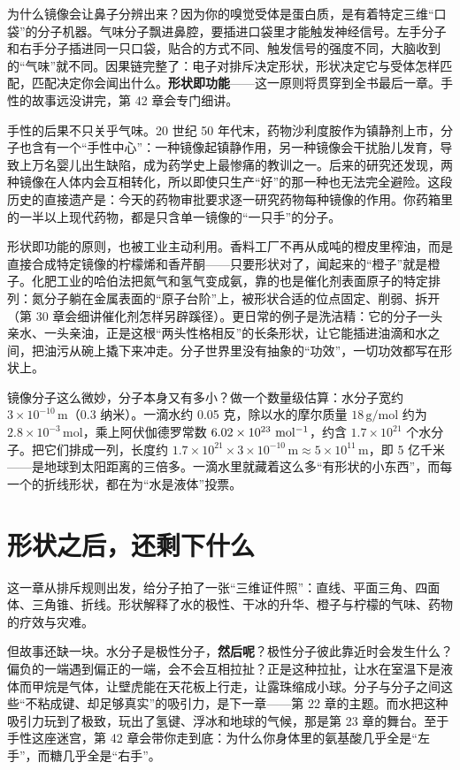 为什么镜像会让鼻子分辨出来？因为你的嗅觉受体是蛋白质，是有着特定三维“口袋”的分子机器。气味分子飘进鼻腔，要插进口袋里才能触发神经信号。左手分子和右手分子插进同一只口袋，贴合的方式不同、触发信号的强度不同，大脑收到的“气味”就不同。因果链完整了：电子对排斥决定形状，形状决定它与受体怎样匹配，匹配决定你会闻出什么。\textbf{形状即功能}——这一原则将贯穿到全书最后一章。手性的故事远没讲完，第 42 章会专门细讲。

手性的后果不只关乎气味。20 世纪 50 年代末，药物沙利度胺作为镇静剂上市，分子也含有一个“手性中心”：一种镜像起镇静作用，另一种镜像会干扰胎儿发育，导致上万名婴儿出生缺陷，成为药学史上最惨痛的教训之一。后来的研究还发现，两种镜像在人体内会互相转化，所以即使只生产“好”的那一种也无法完全避险。这段历史的直接遗产是：今天的药物审批要求逐一研究药物每种镜像的作用。你药箱里的一半以上现代药物，都是只含单一镜像的“一只手”的分子。

形状即功能的原则，也被工业主动利用。香料工厂不再从成吨的橙皮里榨油，而是直接合成特定镜像的柠檬烯和香芹酮——只要形状对了，闻起来的“橙子”就是橙子。化肥工业的哈伯法把氮气和氢气变成氨，靠的也是催化剂表面原子的特定排列：氮分子躺在金属表面的“原子台阶”上，被形状合适的位点固定、削弱、拆开（第 30 章会细讲催化剂怎样另辟蹊径）。更日常的例子是洗洁精：它的分子一头亲水、一头亲油，正是这根“两头性格相反”的长条形状，让它能插进油滴和水之间，把油污从碗上撬下来冲走。分子世界里没有抽象的“功效”，一切功效都写在形状上。

镜像分子这么微妙，分子本身又有多小？做一个数量级估算：水分子宽约 $3\times 10^{-10}\,\mathrm{m}$（0.3 纳米）。一滴水约 0.05 克，除以水的摩尔质量 $18\,\mathrm{g/mol}$ 约为 $2.8\times 10^{-3}\,\mathrm{mol}$，乘上阿伏伽德罗常数 $6.02\times 10^{23}\ \mathrm{mol^{-1}}$，约含 $1.7\times 10^{21}$ 个水分子。把它们排成一列，长度约 $1.7\times 10^{21} \times 3\times 10^{-10}\,\mathrm{m} \approx 5\times 10^{11}\,\mathrm{m}$，即 5 亿千米——是地球到太阳距离的三倍多。一滴水里就藏着这么多“有形状的小东西”，而每一个的折线形状，都在为“水是液体”投票。

\section{形状之后，还剩下什么}

这一章从排斥规则出发，给分子拍了一张“三维证件照”：直线、平面三角、四面体、三角锥、折线。形状解释了水的极性、干冰的升华、橙子与柠檬的气味、药物的疗效与灾难。

但故事还缺一块。水分子是极性分子，\textbf{然后呢}？极性分子彼此靠近时会发生什么？偏负的一端遇到偏正的一端，会不会互相拉扯？正是这种拉扯，让水在室温下是液体而甲烷是气体，让壁虎能在天花板上行走，让露珠缩成小球。分子与分子之间这些“不粘成键、却足够真实”的吸引力，是下一章——第 22 章的主题。而水把这种吸引力玩到了极致，玩出了氢键、浮冰和地球的气候，那是第 23 章的舞台。至于手性这座迷宫，第 42 章会带你走到底：为什么你身体里的氨基酸几乎全是“左手”，而糖几乎全是“右手”。

